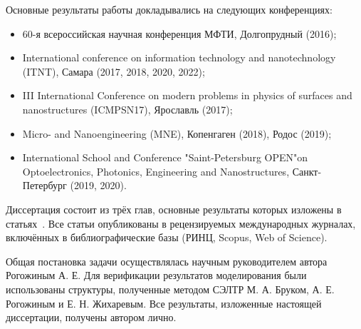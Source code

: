 Основные результаты работы докладывались на следующих конференциях:
\begin{itemize}
	\item 60-я всероссийская научная конференция МФТИ, Долгопрудный (2016);
	\item International conference on information technology and nanotechnology (ITNT), Самара (2017, 2018, 2020, 2022);
	\item III International Conference on modern problems in physics of surfaces and nanostructures (ICMPSN17), Ярославль (2017);
	\item Micro- and Nanoengineering (MNE), Копенгаген (2018), Родос (2019);
	\item International School and Conference "Saint-Petersburg OPEN"on Optoelectronics, Photonics, Engineering and Nanostructures, Санкт-Петербург (2019, 2020).	
\end{itemize}

Диссертация состоит из трёх глав, основные результаты которых изложены в статьях~\cite{my_CO, my_microlenses, my_evidence, my_detailed, my_review, my_MEE, my_Gvalue, my_microscopic, my_Isaev}. Все статьи опубликованы в рецензируемых международных журналах, включённых в библиографические базы (РИНЦ, Scopus, Web of Science).


\contribution

Общая постановка задачи осуществлялась научным руководителем автора Рогожиным А. Е. Для верификации результатов моделирования были использованы структуры, полученные методом СЭЛТР М. А. Бруком, А. Е. Рогожиным и Е. Н. Жихаревым. Все результаты, изложенные настоящей диссертации, получены автором лично.
